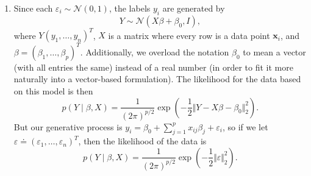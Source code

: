 \documentclass{article}
\begin{document}
\begin{enumerate}
	\item Since each $\varepsilon_i \sim \mathcal{N}(0,1)$, the labels $y_i$ are generated by
		\[
			Y \sim \mathcal{N}(X \beta + \beta_0, I),
		\] where $Y (y_1, \dots, y_n)^T$, $X$ is a matrix where every row is a data point $\mathbf{x}_i$, and $\beta = (\beta_1, \dots, \beta_p)^T$. Additionally, we overload the notation $\beta_0$ to mean a vector (with all entries the same) instead of a real number (in order to fit it more naturally into a vector-based formulation). The likelihood for the data based on this model is then
		\[
			p(Y \;|\; \beta, X) = \frac{1}{(2\pi)^{p/2}} \exp\left( -\frac{1}{2} \Vert{Y-X\beta-\beta_0}\Vert_{2}^{2} \right).
		\] 
		But our generative process is $y_i = \beta_0 + \sum_{j=1}^{p} x_{ij} \beta_j + \varepsilon_i$, so if we let $\varepsilon \doteq (\varepsilon_1, \dots, \varepsilon_n)^T$, then the likelihood of the data is
		\[
		p(Y \;|\; \beta, X) = \frac{1}{(2\pi)^{p/2}} \exp\left( -\frac{1}{2} \Vert{\varepsilon}\Vert_{2}^{2} \right).
		\] 


\end{enumerate}
\end{document}
